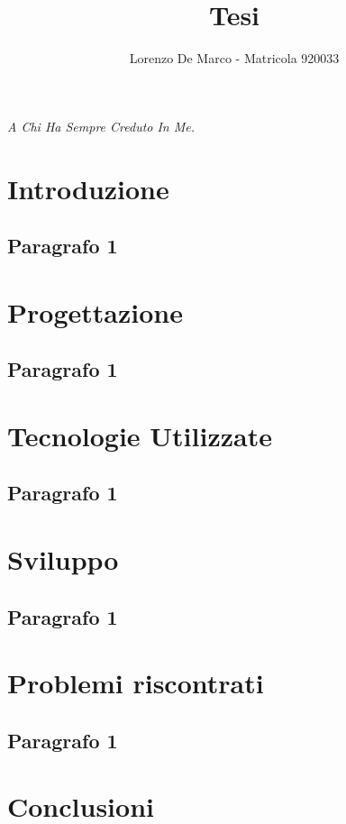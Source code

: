 \documentclass[14pt]{extbook}
\title{Tesi}
\date{}
\begin{document}
\frontmatter

\clearpage
\thispagestyle{empty}
\vspace*{5cm}
\begin{flushright}
    \textit{A Chi Ha Sempre Creduto In Me.}
\end{flushright}
\clearpage

\mainmatter
\author{Lorenzo De Marco - Matricola 920033} 

\maketitle

\tableofcontents
\pagestyle{plain}


\chapter{Introduzione}
\section{Paragrafo 1}

\chapter{Progettazione}
\section{Paragrafo 1}

\chapter{Tecnologie Utilizzate}
\section{Paragrafo 1}

\chapter{Sviluppo}
\section{Paragrafo 1}

\chapter{Problemi riscontrati}
\section{Paragrafo 1}

\chapter{Conclusioni}
\end{document}
